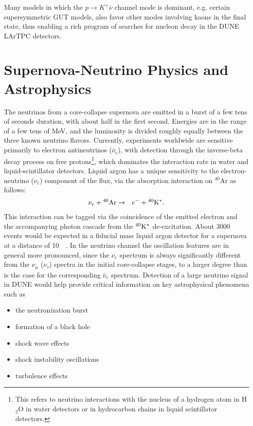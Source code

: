 Many models in which the $p\to K^+\overline{\nu}$ channel mode is
dominant, e.g. certain supersymmetric GUT models, also favor other
modes involving kaons in the final state, thus enabling a rich program
of searches for nucleon decay in the DUNE LArTPC detectors.


\section{Supernova-Neutrino Physics and Astrophysics}

The neutrinos from a core-collapse supernova are emitted in a burst of
a few tens of seconds duration, with about half in the first
second. Energies are in the range of a few tens of MeV, and the
luminosity is divided roughly equally between the three known neutrino
flavors.  Currently, experiments worldwide are sensitive primarily to
electron antineutrinos ($\bar{\nu}_e$), with detection through the inverse-beta decay
process on free protons\footnote{This refers to neutrino interactions with the nucleus of a
hydrogen atom in H$_2$O in water detectors or in hydrocarbon chains in 
liquid scintillator detectors.},
 which dominates the interaction rate in water
and liquid-scintillator detectors.  Liquid argon has a unique sensitivity to
the electron-neutrino ($\nu_e$) component of the flux, via the absorption
interaction on $^{40}$Ar as follows:
\begin{eqnarray*}
\nu_e +{}^{40}{\rm Ar} & \rightarrow & e^-+{}^{40}{\rm K^*}.
\end{eqnarray*} 
This interaction can be tagged via the coincidence of the emitted
electron and the accompanying photon cascade from the $^{40}{\rm K^*}$
de-excitation.  About \num{3000} events would be expected in a 
fiducial mass liquid argon detector for a supernova at a distance of
\SI{10}{\kilo\parsec}.  In the neutrino channel the oscillation
features are in general more pronounced, since the $\nu_e$ spectrum is
always significantly different from the $\nu_\mu$ ($\nu_\tau$) spectra
in the initial core-collapse stages, to a larger degree than is the
case for the corresponding $\bar{\nu}_e$ spectrum.  Detection of a large
neutrino signal in DUNE would help provide critical information on key
astrophysical phenomena such as
\begin{itemize}
\item the neutronization burst
\item formation of a black hole
\item shock wave effects
\item shock instability oscillations
\item turbulence effects
\end{itemize}

